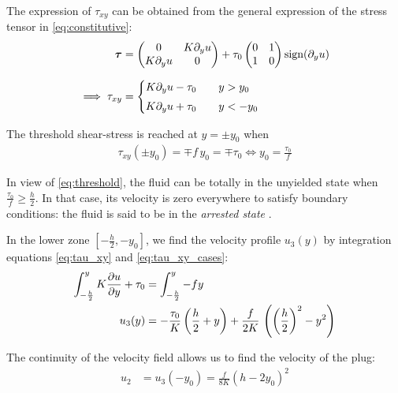 \documentclass[11 pt]{report}
\begin{document}
The expression of $\tau_{xy}$ can be obtained from the general expression of the stress tensor in \eqref{eq:constitutive}:
\begin{align}
    \boldsymbol{\tau} &=
    \begin{pmatrix}
        0 & K \partial_y u\\
        K \partial_y u & 0\\
    \end{pmatrix} + \tau_0
    \begin{pmatrix}
        0 & 1\\
        1 & 0\\
    \end{pmatrix} \sign(\partial_y u) \\[6pt] %
    \implies \tau_{xy} &=
    \begin{cases}
        K \partial_y u - \tau_0  \qquad y > y_0\\[3pt]
        K \partial_y u + \tau_0  \qquad y < -y_0\\
    \end{cases} \label{eq:tau_xy_cases}
\end{align}

The threshold shear-stress is reached at $y=\pm y_0$ when 
\begin{align}
    \tau_{xy}(\pm y_0) = \mp f \, y_0 = \mp \tau_0 \iff y_0 = \frac{\tau_0}{f} \label{eq:threshold}
\end{align}

In view of \eqref{eq:threshold}, the fluid can be totally in the unyielded state when $\frac{\tau_0}{f} \geq \frac{h}{2}$. In that case, its velocity is zero everywhere to satisfy boundary conditions: the fluid is said to be in the \textit{arrested state} \cite{Saramito}.

In the lower zone $[-\frac{h}{2}, -y_0]$, we find the velocity profile $u_3(y)$ by integration equations \eqref{eq:tau_xy} and \eqref{eq:tau_xy_cases}:
\begin{align}
    \int_{-\frac{h}{2}}^y K \pdv{u}{y} + \tau_0 &= \int_{-\frac{h}{2}}^y -f y\\
    u_3(y) &= -\frac{\tau_0}{K} \left(\frac{h}{2}+y\right) + \frac{f}{2K} \, \left(\left(\frac{h}{2}\right)^2 - y^2\right)
\end{align}

The continuity of the velocity field allows us to find the velocity of the plug:
\begin{align}
    u_2 &= u_3(-y_0) = %
    \frac{f}{8K} \left(h - 2y_0\right)^2
\end{align}
\end{document}
